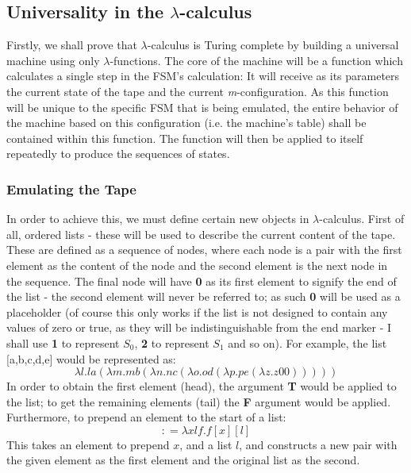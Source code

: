 \documentclass[Master.tex]{subfiles}
\begin{document}
\subsection{Universality in the $\lambda$-calculus}
Firstly, we shall prove that $\lambda$-calculus is Turing complete by building a universal machine using only $\lambda$-functions. The core of the machine will be a function which calculates a single step in the FSM's calculation: It will receive as its parameters the current state of the tape and the current \textit{m}-configuration. As this function will be unique to the specific FSM that is being emulated, the entire behavior of the machine based on this configuration (i.e. the machine's table) shall be contained within this function. The function will then be applied to itself repeatedly to produce the sequences of states.

\subsubsection{Emulating the Tape}\label{sec:LambdaUnivTape}
In order to achieve this, we must define certain new objects in $\lambda$-calculus. First of all, ordered lists - these will be used to describe the current content of the tape. These are defined as a sequence of nodes, where each node is a pair with the first element as the content of the node and the second element is the next node in the sequence. The final node will have \textbf{0} as its first element to signify the end of the list - the second element will never be referred to; as such \textbf{0} will be used as a placeholder (of course this only works if the list is not designed to contain any values of zero or true, as they will be indistinguishable from the end marker - I shall use \textbf{1} to represent $S_0$, \textbf{2} to represent $S_1$ and so on). For example, the list [a,b,c,d,e] would be represented as:
\begin{equation*}
\lambda l.la(\lambda m.mb(\lambda n.nc(\lambda o.od(\lambda p.pe(\lambda z.z\bm{\mathrm{00}})))))
\end{equation*}
In order to obtain the first element (head), the argument \textbf{T} would be applied to the list; to get the remaining elements (tail) the \textbf{F} argument would be applied. 
Furthermore, to prepend an element to the start of a list:
\begin{equation*}
\bm{\mathrm{:}} = \lambda xlf.f[x][l]
\end{equation*}
This takes an element to prepend $x$, and a list $l$, and constructs a new pair with the given element as the first element and the original list as the second.
 
\end{document}
